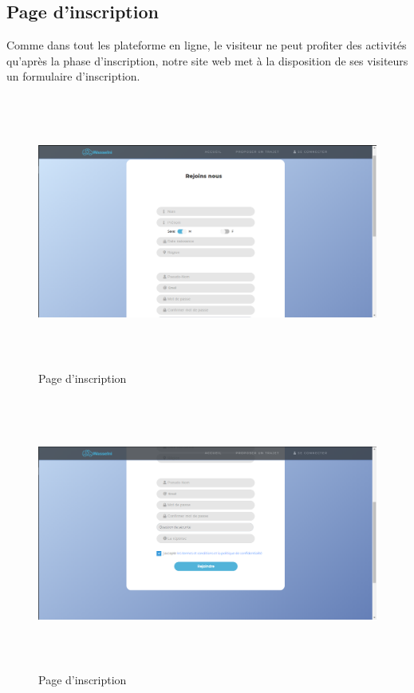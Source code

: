 \documentclass[a4paper]{report}
\begin{document}
\begin{spacing}{2}
\subsection{Page d'inscription}
Comme dans tout les plateforme en ligne, le visiteur ne peut profiter des activités qu’après la phase d’inscription, notre site web met à la disposition de ses visiteurs un formulaire d’inscription.\\ 
\begin{figure}[!ht]
\begin{center}
\includegraphics[height=9cm]{insc1.png}
\end{center}
\caption[Page d'inscription]{Page d'inscription}
\end{figure}
\begin{figure}[!ht]
\begin{center}
\includegraphics[height=9cm]{insc2.png}
\end{center}
\caption[Page d'inscription]{Page d'inscription}
\end{figure}


\end{spacing}
\end{document}
